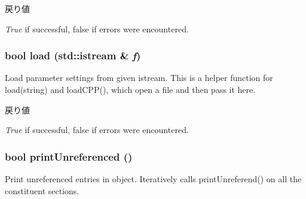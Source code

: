 \begin{DoxyRetVals}{戻り値}
\item[{\em True}]if successful, false if errors were encountered. \end{DoxyRetVals}
\hypertarget{classIniFile_ad078477a284c35e76732419bb20e1162}{
\subsubsection[{load}]{\setlength{\rightskip}{0pt plus 5cm}bool load (std::istream \& {\em f})}}
\label{classIniFile_ad078477a284c35e76732419bb20e1162}
Load parameter settings from given istream. This is a helper function for load(string) and loadCPP(), which open a file and then pass it here. 
\begin{DoxyRetVals}{戻り値}
\item[{\em True}]if successful, false if errors were encountered. \end{DoxyRetVals}
\hypertarget{classIniFile_a667c11ebcd087cd37343736725fa0071}{
\subsubsection[{printUnreferenced}]{\setlength{\rightskip}{0pt plus 5cm}bool printUnreferenced ()}}
\label{classIniFile_a667c11ebcd087cd37343736725fa0071}
Print unreferenced entries in object. Iteratively calls printUnreferend() on all the constituent sections. 



